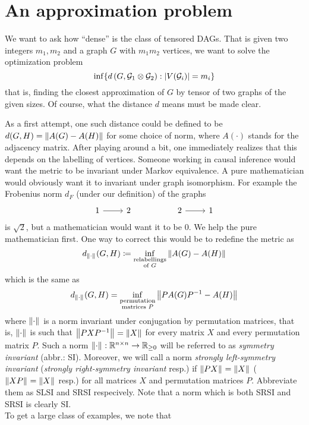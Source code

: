 \section{An approximation problem}

We want to ask how ``dense'' is the class of tensored DAGs. That is given two integers $m_1,m_2$ and a graph $G$ with $m_1m_2$ vertices, we want to solve the optimization problem $$\inf \{d\left(G, {\mathcal{G}}_1\otimes {\mathcal{G}}_2\right): \left| V({\mathcal{G}}_i) \right| = m_i\}$$
that is, finding the closest approximation of $G$ by tensor of two graphs of the given sizes. Of course, what the distance $d$ means must be made clear. 

As a first attempt, one such distance could be defined to be $d(G,H) = \left\lVert A(G)-A(H) \right\rVert_{}$ for some choice of norm, where $A(\cdot)$ stands for the adjacency matrix. After playing around a bit, one immediately realizes that this depends on the labelling of vertices. Someone working in causal inference would want the metric to be invariant under Markov equivalence. A pure mathematician would obviously want it to invariant under graph isomorphism. For example the Frobenius norm $d_F$ (under our definition) of the graphs \[\begin{tikzcd}
	1 & 2 && 2 & 1
	\arrow[from=1-4, to=1-5]
	\arrow[from=1-1, to=1-2]
\end{tikzcd}\]
is $\sqrt 2$, but a mathematician would want it to be $0$. We help the pure mathematician first. One way to correct this would be to redefine the metric as $$d_{\left\lVert \cdot \right\rVert_{}}(G,H) \coloneqq \inf_{\substack{\text{relabellings}\\\text{of }G}}\left\lVert A(G)-A(H) \right\rVert_{}$$ which is the same as $$d_{\left\lVert \cdot \right\rVert_{}}(G,H) = \inf_{\substack{\text{permutation}\\\text{matrices }P}}\left\lVert PA(G)P^{-1}-A(H) \right\rVert_{}$$ where $\left\lVert \cdot \right\rVert_{}$ is a norm invariant under conjugation by permutation matrices, that is, $\left\lVert \cdot \right\rVert_{}$ is such that $\left\lVert PXP^{-1} \right\rVert_{} = \left\lVert X \right\rVert_{}$ for every matrix $X$ and every permutation matrix $P$. Such a norm $\left\lVert \cdot \right\rVert_{}:\mathbb{R}^{n\times n}\to \mathbb{R}_{\geq 0}$ will be referred to as \textit{symmetry invariant} (abbr.: SI). Moreover, we will call a norm \textit{strongly left-symmetry invariant} (\textit{strongly right-symmetry invariant} resp.) if $\left\lVert PX \right\rVert_{} = \left\lVert X \right\rVert_{}$ ($\left\lVert XP \right\rVert_{} = \left\lVert X \right\rVert_{}$ resp.) for all matrices $X$ and permutation matrices $P$. Abbreviate them as SLSI and SRSI respecively.
Note that a norm which is both SRSI and SRSI is clearly SI.\\
To get a large class of examples, we note that
